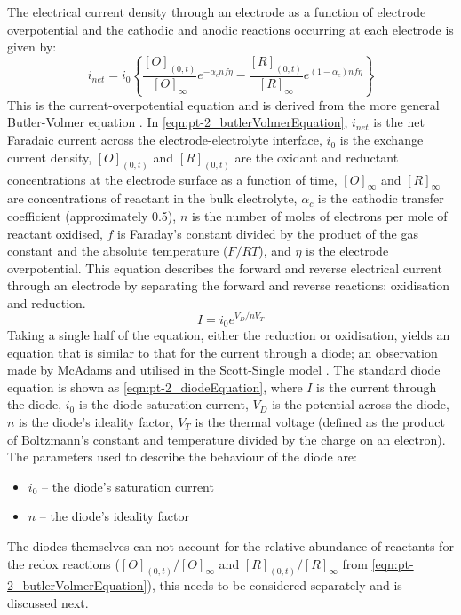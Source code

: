     The electrical current density through an electrode as a function of electrode overpotential and the cathodic and anodic reactions occurring at each electrode is given by:
    \begin{equation}
      i_{net} = i_{0} \left\{ \frac{[O]_{(0,t)}}{[O]_{\infty}}e^{-\alpha_{c}nf\eta} - \frac{[R]_{(0,t)}}{[R]_{\infty}}e^{(1-\alpha_{c})nf\eta}\right\}
      \label{eqn:pt-2_butlerVolmerEquation}
    \end{equation}
    This is the current-overpotential equation and is derived from the more general Butler-Volmer equation \cite{Merrill2005,ScottSingle2013}.
    In \cref{eqn:pt-2_butlerVolmerEquation}, $i_{net}$ is the net Faradaic current across the electrode-electrolyte interface,
    $i_{0}$ is the exchange current density,
    $[O]_{(0,t)}$ and $[R]_{(0,t)}$ are the oxidant and reductant concentrations at the electrode surface as a function of time,
    $[O]_{\infty}$ and $[R]_{\infty}$ are concentrations of reactant in the bulk electrolyte,
    $\alpha_{c}$ is the cathodic transfer coefficient (approximately 0.5),
    $n$ is the number of moles of electrons per mole of reactant oxidised,
    $f$ is Faraday's constant divided by the product of the gas constant and the absolute temperature ($F/RT$),
    and $\eta$ is the electrode overpotential.
    This equation describes the forward and reverse electrical current through an electrode by separating the forward and reverse reactions: oxidisation and reduction.
    \begin{equation}
      I = i_0 e^{V_D / n V_T}
      \label{eqn:pt-2_diodeEquation}
    \end{equation}
    Taking a single half of the equation, either the reduction or oxidisation, yields an equation that is similar to that for the current through a diode; an observation made by McAdams and utilised in the Scott-Single model \cite{McAdams1995}.
    The standard diode equation is shown as \cref{eqn:pt-2_diodeEquation}, where
    $I$ is the current through the diode,
    $i_0$ is the diode saturation current,
    $V_D$ is the potential across the diode,
    $n$ is the diode's ideality factor,
    $V_T$ is the thermal voltage (defined as the product of Boltzmann's constant and temperature divided by the charge on an electron).
    The parameters used to describe the behaviour of the diode are:
    \begin{itemize}
      \item $i_0$ -- the diode's saturation current
      \item $n$ -- the diode's ideality factor
    \end{itemize}
    The diodes themselves can not account for the relative abundance of reactants for the redox reactions ($[O]_{(0,t)}/[O]_{\infty}$ and $[R]_{(0,t)}/[R]_{\infty}$ from \cref{eqn:pt-2_butlerVolmerEquation}), this needs to be considered separately and is discussed next.


